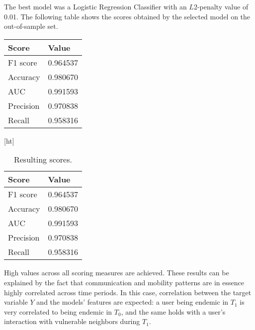 The best model was a Logistic Regression Classifier with an $L2$-penalty value of 0.01.
The following table
shows the scores obtained by the selected model on the out-of-sample set.

\begin{center}
	\begin{tabular}{ l l }
		\toprule
		Score & Value \\
		\midrule
		F1 score & 0.964537  \\
		Accuracy & 0.980670  \\
		AUC    & 0.991593  \\
		Precision & 0.970838  \\
		Recall  & 0.958316  \\
		\bottomrule
	\end{tabular}
\end{center}


\begin{table}\label{tab:results}[ht]
	\caption{Resulting scores.}

	\centering
	\begin{tabular}{ l l }
		\toprule
		Score & Value \\
		\midrule
		F1 score & 0.964537  \\
		Accuracy & 0.980670  \\
		AUC    & 0.991593  \\
		Precision & 0.970838  \\
		Recall  & 0.958316  \\
		\bottomrule
	\end{tabular}
\end{table}

High values across all scoring measures are achieved. %
These results can be explained by the fact that
communication and mobility patterns are in essence highly correlated across time periods.
In this case, correlation between the target variable $Y$ and the models' features are expected:
a user being endemic in $T_1$ is very correlated to being endemic in $T_0$, and the same holds with a user's interaction with vulnerable neighbors during $T_1$.

